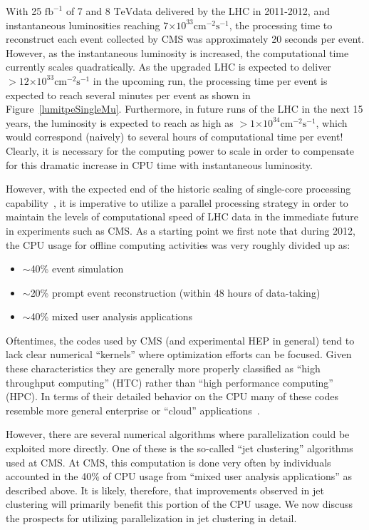 \documentclass[12pt]{article}
\newcommand{\TeV}{\ensuremath{\mathrm{TeV}}}
\newcommand{\fbinv}        {\ensuremath{\mathrm{fb}^{-1}}}
\newcommand{\instlumiA}     {\ensuremath{\times 10^{33} \mathrm{cm}^{-2} \mathrm{s}^{-1}}}
\newcommand{\instlumiB}     {\ensuremath{\times 10^{34} \mathrm{cm}^{-2} \mathrm{s}^{-1}}}
\begin{document}
With 25 $\fbinv$ of 7 and 8 \TeV data delivered by the LHC in
2011-2012, and instantaneous luminosities reaching
$7\instlumiA$, the processing
time to reconstruct each event collected by CMS was approximately 20
seconds per event. However, as the instantaneous luminosity is
increased, the computational time currently scales quadratically. As
the upgraded LHC is expected to deliver $>12\instlumiA$ in the
upcoming run, the processing time per event is expected to reach
several minutes per event as shown in
Figure~\ref{lumitpeSingleMu}. Furthermore, in future runs of the LHC
in the next 15 years, the luminosity is expected to reach as high as
$>1\instlumiB$, which would correspond (naively) to several hours of
computational time per event! Clearly, it is necessary for the
computing power to scale in order to compensate for this dramatic
increase in CPU time with instantaneous luminosity. 



However, with the expected end of the historic scaling of single-core
processing capability~\cite{GAMEOVER}, it is imperative to utilize a
parallel processing
strategy in order to maintain the levels of computational speed of LHC
data in the immediate future in experiments such as CMS.
As a starting point we first note that during 
2012, the CPU usage for offline computing activities was very 
roughly divided up as:

\begin{itemize}
\item $\sim$40\% event simulation
\item $\sim$20\% prompt event reconstruction (within 48 hours of data-taking)
\item $\sim$40\% mixed user analysis applications
\end{itemize}

Oftentimes,
the codes used by CMS (and experimental HEP in general) tend to lack
clear numerical ``kernels'' where optimization efforts can be focused. 
Given these characteristics they are generally more properly classified as
``high throughput computing'' (HTC) rather than ``high performance computing'' (HPC). 
In terms of their detailed behavior on the CPU many of these codes resemble
more general enterprise or ``cloud''
applications~\cite{CLOUDSUITE,GOODACHEP}.

However, there are several numerical algorithms where parallelization
could be exploited more directly. One of these is the so-called ``jet
clustering'' algorithms used at CMS. 
At CMS, this computation is done very often by individuals accounted
in the 40\% of CPU usage from ``mixed user analysis applications'' as
described above. It is likely, therefore, that improvements observed
in jet clustering will primarily benefit this portion of the CPU
usage. We now discuss the prospects for
utilizing parallelization in jet clustering in detail. 
\end{document}
